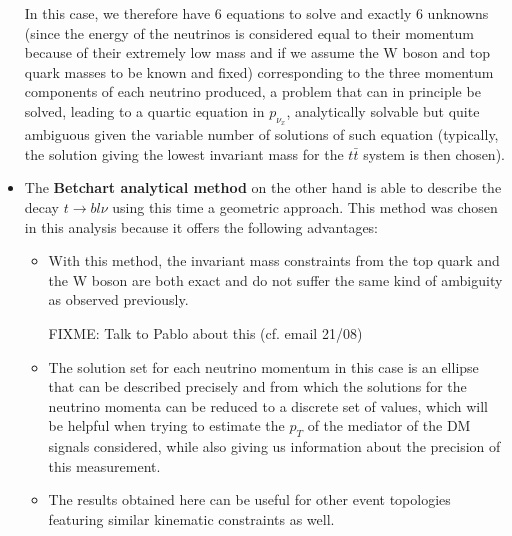 \documentclass[a4paper, 10pt, openright]{report}
\begin{document}
\begin{itemize}
In this case, we therefore have 6 equations to solve and exactly 6 unknowns (since the energy of the neutrinos is considered equal to their momentum because of their extremely low mass and if we assume the W boson and top quark masses to be known and fixed) corresponding to the three momentum components of each neutrino produced, a problem that can in principle be solved, leading to a quartic equation in $p_{\nu_x}$, analytically solvable but quite ambiguous given the variable number of solutions of such equation (typically, the solution giving the lowest invariant mass for the $t \bar t$ system is then chosen).


\item The \textbf{Betchart analytical method} \cite{Betchart} on the other hand is able to describe the decay $t \rightarrow bl\nu$ using this time a geometric approach. This method was chosen in this analysis because it offers the following advantages:
\begin{itemize}
\item With this method, the invariant mass constraints from the top quark and the W boson are both exact and do not suffer the same kind of ambiguity as observed previously. 

\color{red} FIXME: Talk to Pablo about this (cf. email 21/08) \color{black}

\item The solution set for each neutrino momentum in this case is an ellipse that can be described precisely and from which the solutions for the neutrino momenta can be reduced to a discrete set of values, which will be helpful when trying to estimate the $p_T$ of the mediator of the \ac{DM} signals considered, while also giving us information about the precision of this measurement.
\item The results obtained here can be useful for other event topologies featuring similar kinematic constraints as well.
\end{itemize}


\end{itemize}
\end{document}
